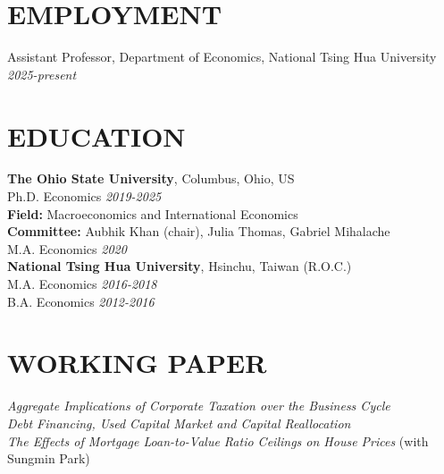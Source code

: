 \documentclass[11pt]{res} %
\begin{document}
\begin{resume}


\section{EMPLOYMENT}
Assistant Professor, Department of Economics, National Tsing Hua University \hfill \textit{2025-present}


\section{EDUCATION}
\vspace{8pt} %
{\bf The Ohio State University}, Columbus, Ohio, US \\
Ph.D. Economics \hfill  \textit{2019-2025} \\
\textbf{Field: } Macroeconomics and International Economics \\
\textbf{Committee: } Aubhik Khan (chair), Julia Thomas, Gabriel Mihalache \\
M.A. Economics \hfill  \textit{2020} \\

{\bf National Tsing Hua University}, Hsinchu, Taiwan (R.O.C.) \\
M.A. Economics \hfill  \textit{2016-2018} \\
B.A. Economics \hfill  \textit{2012-2016}


\section{WORKING PAPER}
\label{sec:research_experience}
\vspace{8pt} %
\textit{Aggregate Implications of Corporate Taxation over the Business Cycle} \\
\textit{Debt Financing, Used Capital Market and Capital Reallocation} \\
\textit{The Effects of Mortgage Loan-to-Value Ratio Ceilings on House Prices} (with Sungmin Park)


\end{resume}
\end{document}
